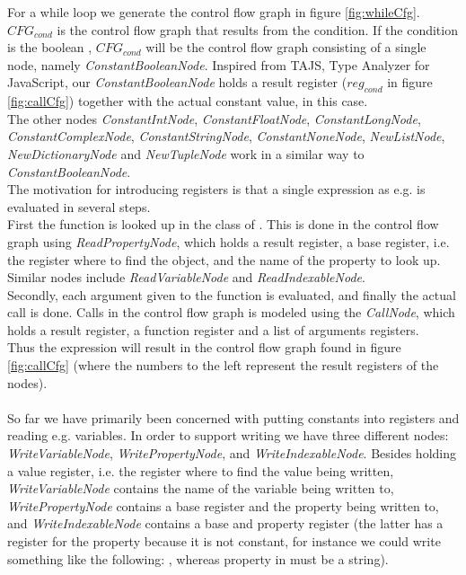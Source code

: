 For a while loop we generate the control flow graph in figure \ref{fig:whileCfg}. \\
$CFG_{cond}$ is the control flow graph that results from the condition. If the condition is the boolean , $CFG_{cond}$ will be the control flow graph consisting of a single node, namely \textit{ConstantBooleanNode}. Inspired from TAJS, Type Analyzer for JavaScript, our \textit{ConstantBooleanNode} holds a result register ($reg_{cond}$ in figure \ref{fig:callCfg}) together with the actual constant value,  in this case. \\
The other nodes \textit{ConstantIntNode}, \textit{ConstantFloatNode}, \textit{ConstantLongNode}, \textit{ConstantComplexNode}, \textit{ConstantStringNode}, \textit{ConstantNoneNode}, \textit{NewListNode}, \textit{NewDictionaryNode} and \textit{NewTupleNode} work in a similar way to \textit{ConstantBooleanNode}. \\
The motivation for introducing registers is that a single expression as e.g.  is evaluated in several steps. \\
First the function  is looked up in the class of . This is done in the control flow graph using \textit{ReadPropertyNode}, which holds a result register, a base register, i.e. the register where to find the object, and the name of the property to look up. Similar nodes include \textit{ReadVariableNode} and \textit{ReadIndexableNode}. \\
Secondly, each argument given to the function is evaluated, and finally the actual call is done. Calls in the control flow graph is modeled using the \textit{CallNode}, which holds a result register, a function register and a list of arguments registers. \\
Thus the expression  will result in the control flow graph found in figure \ref{fig:callCfg} (where the numbers to the left represent the result registers of the nodes).\\
 \\
So far we have primarily been concerned with putting constants into registers and reading e.g. variables. In order to support writing we have three different nodes: \textit{WriteVariableNode}, \textit{WritePropertyNode}, and \textit{WriteIndexableNode}. Besides holding a value register, i.e. the register where to find the value being written, \textit{WriteVariableNode} contains the name of the variable being written to, \textit{WritePropertyNode} contains a base register and the property being written to, and \textit{WriteIndexableNode} contains a base and property register (the latter has a register for the property because it is not constant, for instance we could write something like the following: , whereas property in  must be a string).

